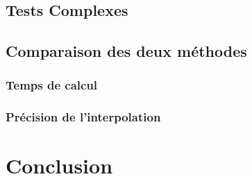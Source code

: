 \documentclass[a4paper,9pt]{article}
\begin{document}
\subsection{Tests Complexes}
\label{subsec:tests_complexes}

\subsection{Comparaison des deux méthodes}
\label{subsec:comparaison_methodes}

\subsubsection{Temps de calcul}
\label{subsec:temps_calcul}

\subsubsection{Précision de l'interpolation}
\label{subsec:precision_interpolation}

\section{Conclusion}
\label{sec:conclusion}
\end{document}
